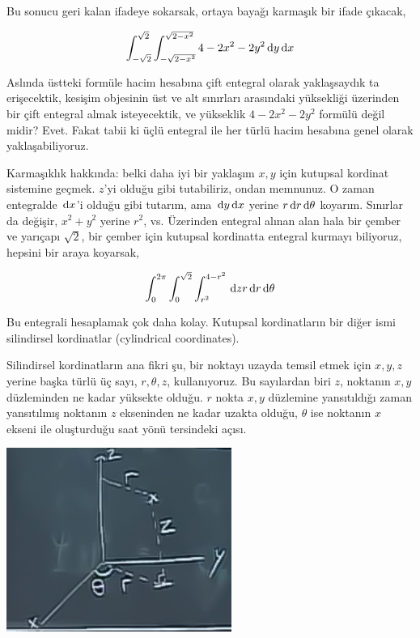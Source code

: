 \documentclass[12pt,fleqn]{article}\usepackage{../../common}
\begin{document}
Bu sonucu geri kalan ifadeye sokarsak, ortaya bayağı karmaşık bir ifade
çıkacak, 

$$ 
\int _{-\sqrt{2}}^{\sqrt{2}} \int _{-\sqrt{2-x^2}}^{\sqrt{2-x^2}} 
4-2x^2-2y^2 \,\mathrm{d} y \,\mathrm{d} x
$$

Aslında üstteki formüle hacim hesabına çift entegral olarak yaklaşsaydık ta
erişecektik, kesişim objesinin üst ve alt sınırları arasındaki yüksekliği
üzerinden bir çift entegral almak isteyecektik, ve yükseklik $4-2x^2-2y^2$
formülü değil midir? Evet. Fakat tabii ki üçlü entegral ile her türlü hacim
hesabına genel olarak yaklaşabiliyoruz.

Karmaşıklık hakkında: belki daha iyi bir yaklaşım $x,y$ için kutupsal
kordinat sistemine geçmek. $z$'yi olduğu gibi tutabiliriz, ondan
memnunuz. O zaman entegralde $\,\mathrm{d} x$'i olduğu gibi tutarım, ama
$\,\mathrm{d} y \,\mathrm{d} x$ yerine $r \,\mathrm{d} r \,\mathrm{d}\theta$ koyarım. Sınırlar da değişir,
$x^2+y^2$ yerine $r^2$, vs. Üzerinden entegral alınan alan hala bir çember
ve yarıçapı $\sqrt{2}$, bir çember için kutupsal kordinatta entegral
kurmayı biliyoruz, hepsini bir araya koyarsak,

$$ 
\int _{0}^{2\pi} \int _{0}^{\sqrt{2}} \int_{r^2}^{4-r^2} 
\,\mathrm{d} z r \,\mathrm{d} r \,\mathrm{d}\theta
$$

Bu entegrali hesaplamak çok daha kolay. Kutupsal kordinatların bir diğer
ismi silindirsel kordinatlar (cylindrical coordinates). 

Silindirsel kordinatların ana fikri şu, bir noktayı uzayda temsil etmek
için $x,y,z$ yerine başka türlü üç sayı, $r,\theta,z$, kullanıyoruz. Bu
sayılardan biri $z$, noktanın $x,y$ düzleminden ne kadar yüksekte
olduğu. $r$ nokta $x,y$ düzlemine yansıtıldığı zaman yansıtılmış noktanın
$z$ ekseninden ne kadar uzakta olduğu, $\theta$ ise noktanın $x$ ekseni ile
oluşturduğu saat yönü tersindeki açısı. 

\begin{center}
\includegraphics[height=6cm]{25_8.png}
\end{center}
\end{document}
